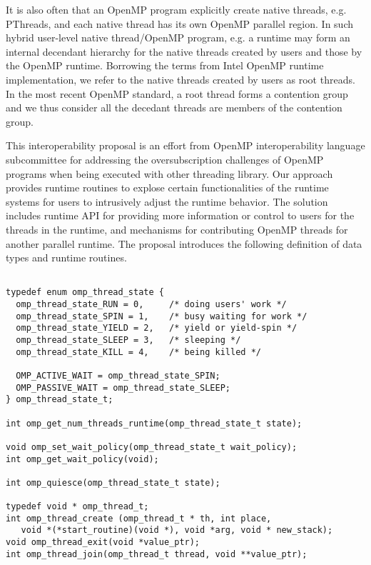 It is also often that an OpenMP program explicitly create native threads, e.g. PThreads, and each native thread has
its own OpenMP {\sf parallel} region. 
In such hybrid user-level native thread/OpenMP program, e.g. 
a runtime may form an internal decendant hierarchy for the native threads created by users and
those by the OpenMP runtime. Borrowing the terms from Intel OpenMP runtime implementation, we refer to 
the native threads created by users as root threads. 
In the most recent OpenMP standard, a root thread forms a contention group and we thus 
consider all the decedant threads are members of the contention group. 


This interoperability proposal is an effort from OpenMP interoperability language subcommittee for addressing
the oversubscription challenges of OpenMP programs when being executed with other threading library. 
Our approach provides runtime routines to explose certain functionalities of the runtime systems for users to 
intrusively adjust the runtime behavior. 
The solution includes runtime API for providing more information or control to users 
for the threads in the runtime, 
and mechanisms for 
contributing OpenMP threads for another parallel runtime. 
The proposal introduces the following definition of data types and runtime routines. 

\lstset{basicstyle=\sffamily\small,language=c, numbersep=1pt}
\begin{lstlisting}[frame=single]  % Start your code-block

typedef enum omp_thread_state {
  omp_thread_state_RUN = 0,     /* doing users' work */
  omp_thread_state_SPIN = 1,    /* busy waiting for work */
  omp_thread_state_YIELD = 2,   /* yield or yield-spin */
  omp_thread_state_SLEEP = 3,   /* sleeping */
  omp_thread_state_KILL = 4,    /* being killed */

  OMP_ACTIVE_WAIT = omp_thread_state_SPIN;
  OMP_PASSIVE_WAIT = omp_thread_state_SLEEP;
} omp_thread_state_t; 

int omp_get_num_threads_runtime(omp_thread_state_t state);

void omp_set_wait_policy(omp_thread_state_t wait_policy);
int omp_get_wait_policy(void);

int omp_quiesce(omp_thread_state_t state);

typedef void * omp_thread_t;
int omp_thread_create (omp_thread_t * th, int place,  
   void *(*start_routine)(void *), void *arg, void * new_stack);
void omp_thread_exit(void *value_ptr);
int omp_thread_join(omp_thread_t thread, void **value_ptr);

\end{lstlisting}

